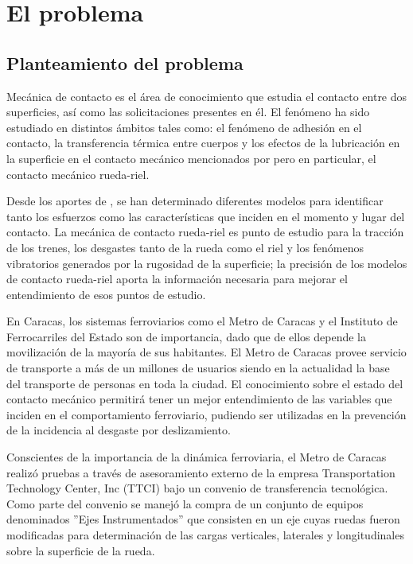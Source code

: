 \documentclass[main]{subfiles}
\begin{document}
\chapter{El problema}
\section{Planteamiento del problema}
	Mecánica de contacto es el área de conocimiento que estudia el contacto entre dos superficies, así como las solicitaciones presentes en él. El fenómeno ha sido estudiado en distintos ámbitos tales como: el fenómeno de adhesión en el contacto, la transferencia térmica entre cuerpos y los efectos de la lubricación en la superficie en el contacto mecánico mencionados por \citet{popov2010contact} pero en particular, el contacto mecánico rueda-riel.

	Desde los aportes de \citet{Herz1881}, se han determinado diferentes modelos para identificar tanto los esfuerzos como las características que inciden en el momento y lugar del contacto. La mecánica de contacto rueda-riel es punto de estudio para la tracción de los trenes, los desgastes tanto de la rueda como el riel y los fenómenos vibratorios generados por la rugosidad de la superficie; la precisión de los modelos de contacto rueda-riel aporta la información necesaria para mejorar el entendimiento de esos puntos de estudio.

	En Caracas, los sistemas ferroviarios como el Metro de Caracas y el Instituto de Ferrocarriles del Estado son de importancia, dado que de ellos depende la movilización de la mayoría de sus habitantes. El Metro de Caracas provee servicio de transporte a más de un millones de usuarios siendo en la actualidad la base del transporte de personas en toda la ciudad. El conocimiento sobre el estado del contacto mecánico permitirá tener un mejor entendimiento de las variables que inciden en el comportamiento ferroviario, pudiendo ser utilizadas en la prevención de la incidencia al desgaste por deslizamiento.	

	Conscientes de la importancia de la dinámica ferroviaria, el Metro de Caracas realizó pruebas a través de asesoramiento externo de la empresa Transportation Technology Center, Inc (TTCI) bajo un convenio de transferencia tecnológica. Como parte del convenio se manejó la compra de un conjunto de equipos denominados ''Ejes Instrumentados'' que consisten en un eje cuyas ruedas fueron modificadas para determinación de las cargas verticales, laterales y longitudinales sobre la superficie de la rueda.
\end{document}
